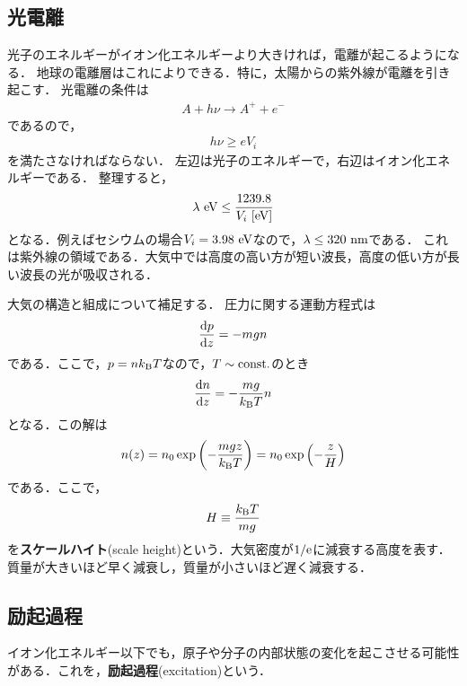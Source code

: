 \documentclass{report}
\begin{document}
    \subsection{光電離}
      光子のエネルギーがイオン化エネルギーより大きければ，電離が起こるようになる．
      地球の電離層はこれによりできる．特に，太陽からの紫外線が電離を引き起こす．
      光電離の条件は
      \begin{align}
        A + h\nu \rightarrow A^+ + e^-
      \end{align}
      であるので，
      \begin{align}
        h\nu \geq e V_i
      \end{align}
      を満たさなければならない．
      左辺は光子のエネルギーで，右辺はイオン化エネルギーである．
      整理すると，
      \begin{align}
        \lambda\ \mathrm{eV} \leq \frac{1239.8}{V_i\ [\mathrm{eV}]}
      \end{align}
      となる．例えばセシウムの場合$V_i = 3.98\ \mathrm{eV}$なので，$\lambda \leq 320\ \mathrm{nm}$である．
      これは紫外線の領域である．大気中では高度の高い方が短い波長，高度の低い方が長い波長の光が吸収される．
      \par
      大気の構造と組成について補足する．
      圧力に関する運動方程式は
      \begin{align}
        \dv{p}{z} = -mgn
      \end{align}
      である．ここで，$p=nk_{\mathrm{B}} T$なので，$T \sim \mathrm{const.}$のとき
      \begin{align}
        \dv{n}{z} = - \frac{mg}{k_{\mathrm{B}} T}n
      \end{align}
      となる．この解は
      \begin{align}
        n(z) = n_0 \exp\qty(-\frac{mgz}{k_{\mathrm{B}} T}) = n_0 \exp\qty(-\frac{z}{H})
      \end{align}
      である．ここで，
      \begin{align}
        H \equiv \frac{k_{\mathrm{B}} T}{mg}
      \end{align}
      を\textbf{スケールハイト}(scale height)という．大気密度が$1/\mathrm{e}$に減衰する高度を表す．
      質量が大きいほど早く減衰し，質量が小さいほど遅く減衰する．

      \subsection{励起過程}
      イオン化エネルギー以下でも，原子や分子の内部状態の変化を起こさせる可能性がある．これを，\textbf{励起過程}(excitation)という．
\end{document}

